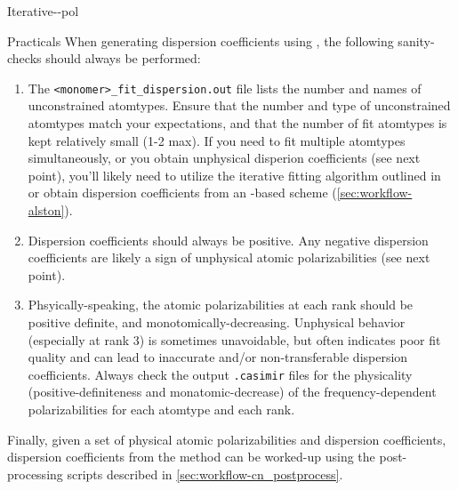 \begin{subsubsection}{Iterative-\dma-pol}
\begin{paragraph}{Practicals}
When generating dispersion coefficients using \idma, the following sanity-checks should
always be performed:
\begin{enumerate}
\item The \verb|<monomer>_fit_dispersion.out| file lists the number and names of
unconstrained atomtypes. Ensure that the number and type of unconstrained atomtypes match your
expectations, and that the number of fit atomtypes is kept relatively small
(1-2 max). If you need to fit multiple atomtypes simultaneously, or you obtain
unphysical disperion coefficients (see next point), you'll likely need to
utilize the iterative fitting algorithm outlined in 
 or obtain dispersion coefficients from an \isa-based
scheme (\cref{sec:workflow-alston}).
%
\item Dispersion coefficients should always be positive. Any negative
dispersion coefficients are likely a sign of unphysical atomic
polarizabilities (see next point).
%
\item Phsyically-speaking, the atomic polarizabilities at each rank should be positive
definite, and monotomically-decreasing.\cite{Williams2003,stone2013theory} Unphysical behavior (especially at
rank 3) is sometimes unavoidable, but often indicates poor fit quality and can
lead to inaccurate and/or non-transferable dispersion coefficients. Always
check the output \verb|.casimir| files for the physicality
(positive-definiteness and monatomic-decrease) of the frequency-dependent
polarizabilities for each atomtype and each rank.
%
\end{enumerate}

Finally, given a set of physical atomic polarizabilities and dispersion
coefficients, dispersion coefficients from the \idma method can be worked-up
using the post-processing scripts described in
\cref{sec:workflow-cn_postprocess}.
\end{paragraph}
\end{subsubsection}







